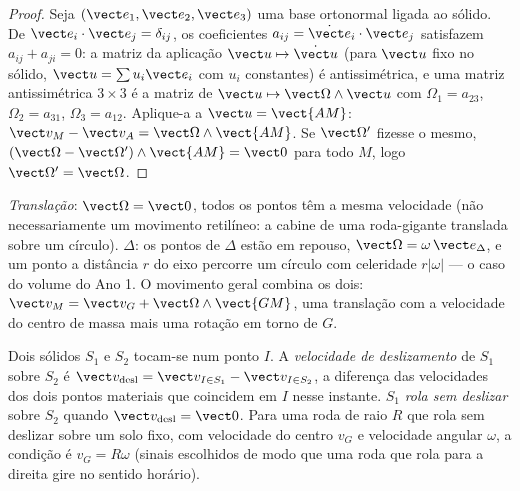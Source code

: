 \begin{proof}
Seja $(\vect e_1, \vect e_2, \vect e_3)$ uma base ortonormal ligada ao
sólido. De $\vect e_i\cdot\vect e_j = \delta_{ij}$, os coeficientes
$a_{ij} = \dot{\vect e}_i\cdot\vect e_j$ satisfazem $a_{ij} + a_{ji} = 0$: a
matriz da aplicação $\vect u \mapsto \dot{\vect u}$ (para $\vect u$ fixo no
sólido, $\vect u = \sum u_i\vect e_i$ com $u_i$ constantes) é
antissimétrica, e uma matriz antissimétrica $3\times3$ é a matriz de
$\vect u \mapsto \vect\Omega\wedge\vect u$ com $\Omega_1 = a_{23}$,
$\Omega_2 = a_{31}$, $\Omega_3 = a_{12}$. Aplique-a a $\vect u =
\vect{AM}$: $\vect v_M - \vect v_A = \vect\Omega\wedge\vect{AM}$. Se
$\vect\Omega'$ fizesse o mesmo, $(\vect\Omega - \vect\Omega')\wedge
\vect{AM} = \vect 0$ para todo $M$, logo $\vect\Omega' = \vect\Omega$.
\end{proof}

\begin{remark}\label{rem:b2:rigid-body-mechanics:motions}
\emph{Translação}: $\vect\Omega = \vect 0$, todos os pontos têm a mesma
velocidade (não necessariamente um movimento retilíneo: a cabine de uma
roda-gigante translada sobre um círculo). \emph{} $\Delta$:
os pontos de $\Delta$ estão em repouso, $\vect\Omega = \omega\,\vect e_\Delta$,
e um ponto a distância $r$ do eixo percorre um círculo com celeridade
$r|\omega|$ --- o caso do volume do Ano 1. O movimento geral combina os
dois: $\vect v_M = \vect v_G + \vect\Omega\wedge\vect{GM}$, uma
translação com a velocidade do centro de massa mais uma rotação em
torno de $G$.
\end{remark}

\begin{definition}\label{def:b2:rigid-body-mechanics:rolling}
Dois sólidos $S_1$ e $S_2$ tocam-se num ponto $I$. A \emph{velocidade
de deslizamento} de $S_1$ sobre $S_2$ é $\vect v_{\text{desl}} = \vect v_{I \in S_1}
- \vect v_{I \in S_2}$, a diferença das velocidades dos dois pontos
materiais que coincidem em $I$ nesse instante. $S_1$ \emph{rola sem
deslizar} sobre $S_2$ quando $\vect v_{\text{desl}} = \vect 0$. Para uma
roda de raio $R$ que rola sem deslizar sobre um solo fixo, com
velocidade do centro $v_G$ e velocidade angular $\omega$, a condição é
$v_G = R\omega$ (sinais escolhidos de modo que uma roda que rola para a
direita gire no sentido horário).
\end{definition}

